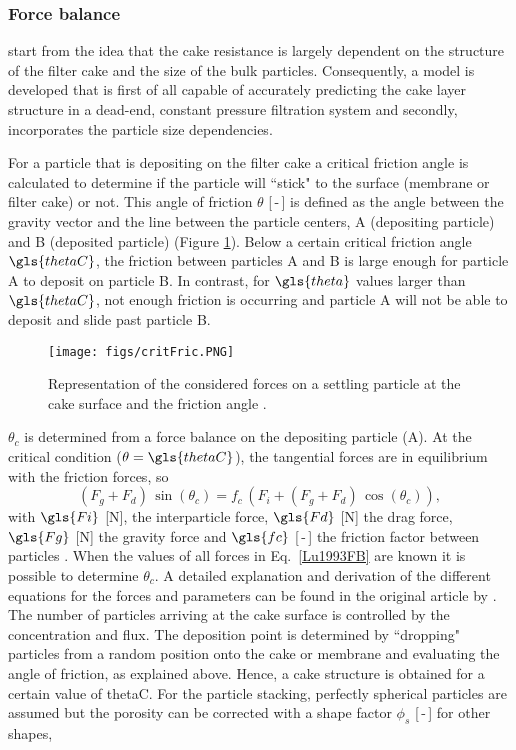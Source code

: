 \subsubsection{Force balance}
\cite{Lu1993} start from the idea that the cake resistance is largely dependent on the structure of the filter cake and the size of the bulk particles. Consequently, a model is developed that is first of all capable of accurately predicting the cake layer structure in a dead-end, constant pressure filtration system and secondly, incorporates the particle size dependencies. \par
For a particle that is depositing on the filter cake a critical friction angle is calculated to determine if the particle will ``stick" to the surface (membrane or filter cake) or not. This angle of friction $\theta$ [\,-\,] is defined as the angle between the gravity vector and the line between the particle centers, A (depositing particle) and B (deposited particle) (Figure \ref{critFric}).
Below a certain critical friction angle $\gls{thetaC}$, the friction between particles A and B is large enough for particle A to deposit on particle B. In contrast, for $\gls{theta}$ values larger than $\gls{thetaC}$, not enough friction is occurring and particle A will not be able to deposit and slide past particle B.
\begin{figure}[H]
\begin{center}
\hspace{-1.5cm}
\texttt{[image: figs/critFric.PNG]}
\caption{Representation of the considered forces on a settling particle at the cake surface and the friction angle \citep{Lu1993}.\label{critFric}}
\end{center}
\end{figure}
$\theta_c$ is determined from a force balance on the depositing particle (A). At the critical condition ($\theta = \gls{thetaC}$), the tangential forces are in equilibrium with the friction forces, so
\begin{equation}
(F_g +F_d)\, \sin(\theta_c) = f_c\,(F_i+(F_g + F_d)\, \cos(\theta_c))
\label{Lu1993FB} ,
\end{equation}
with $\gls{Fi}$ [\unit{\newton}], the interparticle force, $\gls{Fd}$ [\unit{\newton}] the drag force, $\gls{Fg}$ [\unit{\newton}] the gravity force and $\gls{fc}$ [\,-\,] the friction factor between particles \citep{Lu1993}. When the values of all forces in Eq.\ \eqref{Lu1993FB} are known it is possible to determine $\theta_c$. A detailed explanation and derivation of the different equations for the forces and parameters can be found in the original article by \cite{Lu1993}. The number of particles arriving at the cake surface is controlled by the concentration and flux. The deposition point is determined by ``dropping" particles from a random position onto the cake or membrane and evaluating the angle of friction, as explained above. Hence, a cake structure is obtained for a certain value of \gls{thetaC}. For the particle stacking, perfectly spherical particles are assumed but the porosity can be corrected with a shape factor $\phi_s$ [\,-\,] for other shapes,
